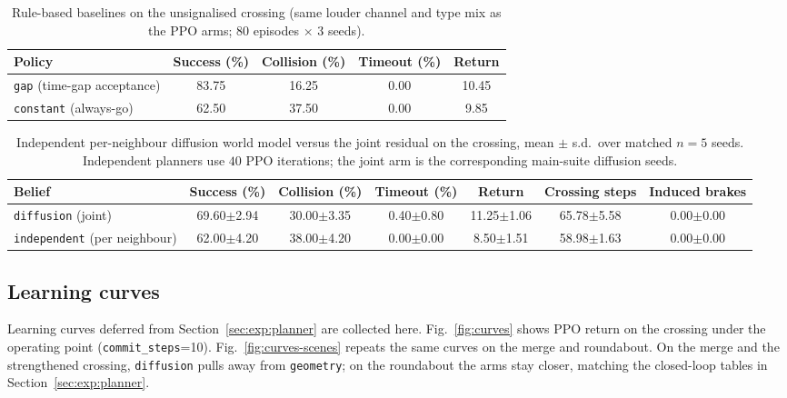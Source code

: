 \documentclass[conference]{IEEEtran}
\begin{document}
\begin{table}[!t]
\caption{Rule-based baselines on the unsignalised crossing (same louder channel and type mix as the PPO arms; $80$ episodes $\times$ $3$ seeds).}
\label{tab:baselines}
\centering
\begin{tabular}{|l|c|c|c|c|}
\hline
\textbf{Policy} & \textbf{Success (\%)} & \textbf{Collision (\%)} & \textbf{Timeout (\%)} & \textbf{Return} \\
\hline
\texttt{gap} (time-gap acceptance) & 83.75 & 16.25 & 0.00 & 10.45 \\
\hline
\texttt{constant} (always-go) & 62.50 & 37.50 & 0.00 & 9.85 \\
\hline
\end{tabular}
\end{table}

\begin{table}[!t]
\caption{Independent per-neighbour diffusion world model versus the joint residual on the crossing, mean $\pm$ s.d.\ over matched $n{=}5$ seeds. Independent planners use $40$ PPO iterations; the joint arm is the corresponding main-suite diffusion seeds.}
\label{tab:independent}
\centering
\begin{tabular}{|l|c|c|c|c|c|c|}
\hline
\textbf{Belief} & \textbf{Success (\%)} & \textbf{Collision (\%)} & \textbf{Timeout (\%)} & \textbf{Return} & \textbf{Crossing steps} & \textbf{Induced brakes} \\
\hline
\texttt{diffusion} (joint) & 69.60$\pm$2.94 & 30.00$\pm$3.35 & 0.40$\pm$0.80 & 11.25$\pm$1.06 & 65.78$\pm$5.58 & 0.00$\pm$0.00 \\ %
\hline
\texttt{independent} (per neighbour) & 62.00$\pm$4.20 & 38.00$\pm$4.20 & 0.00$\pm$0.00 & 8.50$\pm$1.51 & 58.98$\pm$1.63 & 0.00$\pm$0.00 \\ %
\hline
\end{tabular}
\end{table}

\subsection{Learning curves}

Learning curves deferred from Section~\ref{sec:exp:planner} are collected here. Fig.~\ref{fig:curves} shows PPO return on the crossing under the operating
point (\texttt{commit\_steps}{=}10). Fig.~\ref{fig:curves-scenes} repeats the
same curves on the merge and roundabout. On the merge and the strengthened
crossing, \texttt{diffusion} pulls away from \texttt{geometry}; on the
roundabout the arms stay closer, matching the closed-loop tables in
Section~\ref{sec:exp:planner}.
\end{document}
